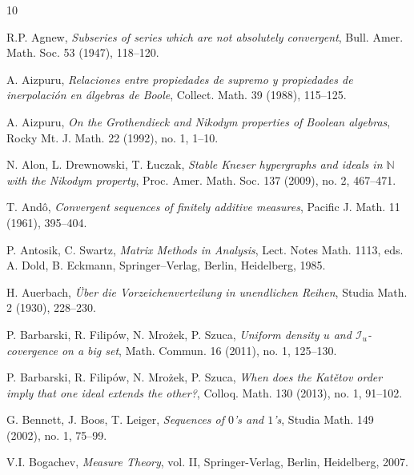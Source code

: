\documentclass[a4paper,11pt,fleqn]{amsart}
\theoremstyle{definition}
\theoremstyle{remark}
\numberwithin{equation}{section}
\newcommand{\iI}{\mathcal{I}}
\begin{document}
\begin{thebibliography}{10}

 R.P. Agnew, \textit{Subseries of series which are not absolutely convergent}, Bull. Amer. Math. Soc. 53 (1947), 118--120.

 A. Aizpuru, \textit{Relaciones entre propiedades de supremo y propiedades de inerpolaci\'on en \'algebras de Boole}, Collect. Math. 39 (1988), 115--125.

 A. Aizpuru, \textit{On the Grothendieck and Nikodym properties of Boolean algebras}, Rocky Mt. J. Math. 22 (1992), no. 1, 1--10. 

 N. Alon, L. Drewnowski, T. \L uczak, \textit{Stable Kneser hypergraphs and ideals in $\mathbb{N}$ with the Nikodym property}, Proc. Amer. Math. Soc. 137 (2009), no. 2, 467--471.

 T. And\^o, \textit{Convergent sequences of finitely additive measures}, Pacific J. Math. 11 (1961), 395--404.

 P. Antosik, C. Swartz, \textit{Matrix Methods in Analysis}, Lect. Notes Math. 1113, eds. A. Dold, B. Eckmann, Springer--Verlag, Berlin, Heidelberg, 1985.

 H. Auerbach, \textit{\"{U}ber die Vorzeichenverteilung in unendlichen Reihen}, Studia Math. 2 (1930), 228--230.

 P. Barbarski, R. Filip\'{o}w, N. Mro\.{z}ek, P. Szuca, \textit{Uniform density $u$ and $\iI_u$-covergence on a big set}, Math. Commun. 16 (2011), no. 1, 125--130.

 P. Barbarski, R. Filip\'{o}w, N. Mro\.{z}ek, P. Szuca, \textit{When does the Kat\v{e}tov order imply that one ideal extends the other?}, Colloq. Math. 130 (2013), no. 1, 91--102.


 G. Bennett, J. Boos, T. Leiger, \textit{Sequences of $0$'s and $1$'s}, Studia Math. 149 (2002), no. 1, 75--99.

 V.I. Bogachev, \textit{Measure Theory}, vol. II, Springer-Verlag, Berlin, Heidelberg, 2007.



\end{thebibliography}
\end{document}
